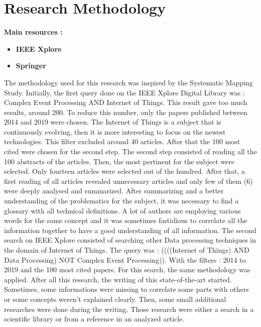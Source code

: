 \documentclass[11pt]{article}
\begin{document}
\newpage


\section{Research Methodology} \label{research-methodology}

\textbf{Main resources :}
\begin{itemize}
	\item \textbf{IEEE Xplore} 
	\item \textbf{Springer} 
\end{itemize}

The methodology used for this research was inspired by the Systematic Mapping Study. \cite{sms} Initially, the first query done on the IEEE Xplore Digital Library was : Complex Event Processing AND Internet of Things. This result gave too much results, around 200. To reduce this number, only the papers published between 2014 and 2019 were chosen. The Internet of Things is a subject that is continuously evolving, then it is more interesting to focus on the newest technologies. This filter excluded around 40 articles. After that the 100 most cited were chosen for the second step.
\newline
\newline
The second step consisted of reading all the 100 abstracts of the articles. Then, the most pertinent for the subject were selected. Only fourteen articles were selected out of the hundred. After that, a first reading of all articles revealed unnecessary articles and only few of them (6) were deeply analysed and summarized. After summarizing and a better understanding of the problematics for the subject, it was necessary to find a glossary \cite{glossary} with all technical definitions. A lot of authors are employing various words for the same concept and it was sometimes fastidious to correlate all the information together to have a good understanding of all information.  
\newline
\newline
The second search on IEEE Xplore consisted of searching other Data processing techniques in the domain of Internet of Things. The query was : ((((Internet of Things) AND Data Processing) NOT Complex Event Processing)). With the filters :  2014 to 2019 and the 100 most cited papers. For this search, the same methodology was applied.
\newline
\newline
After all this research, the writing of this state-of-the-art started. Sometimes, some informations were missing to correlate some parts with others or some concepts weren't explained clearly. Then, some small additional researches were done during the writing. Those research were either a search in a scientific library or from a reference in an analyzed article.
\end{document}
